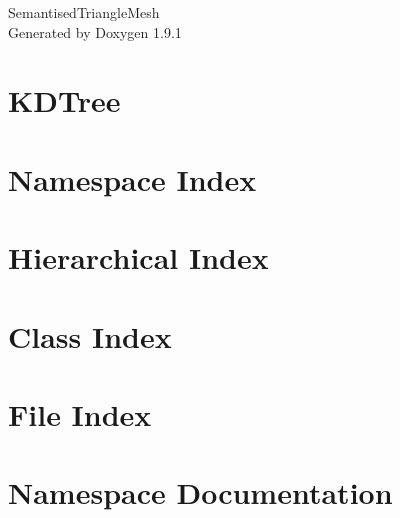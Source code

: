 \let\mypdfximage\pdfximage\def\pdfximage{\immediate\mypdfximage}\documentclass[twoside]{book}
\newcommand{\+}{\discretionary{\mbox{\scriptsize$\hookleftarrow$}}{}{}}
\newcommand{\clearemptydoublepage}{%
  \newpage{\pagestyle{empty}\cleardoublepage}%
}
\begin{document}
\raggedbottom

\hypersetup{pageanchor=false,
             bookmarksnumbered=true,
             pdfencoding=unicode
            }
\begin{titlepage}
\vspace*{7cm}
\begin{center}%
{\Large Semantised\+Triangle\+Mesh }\\
\vspace*{1cm}
{\large Generated by Doxygen 1.9.1}\\
\end{center}
\end{titlepage}
\clearemptydoublepage
{}
\tableofcontents
\clearemptydoublepage
{}
\hypersetup{pageanchor=true}

\chapter{KDTree}
\label{md__home_andreas_Documenti_Progetti_SemantisedTriangleMesh_KDTree_README}

\chapter{Namespace Index}

\chapter{Hierarchical Index}

\chapter{Class Index}

\chapter{File Index}

\chapter{Namespace Documentation}



\end{document}

